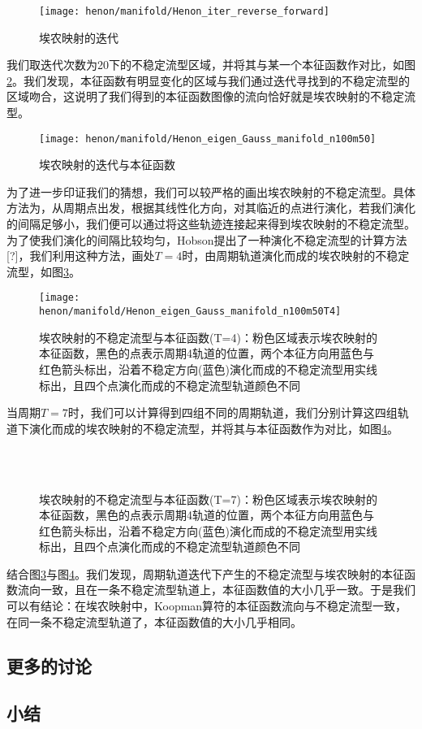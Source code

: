 \begin{figure}
	\centering
	\texttt{[image: henon/manifold/Henon\_iter\_reverse\_forward]}
    \caption{埃农映射的迭代}\label{fig:Henon_iter_reverse_forward}
\end{figure}
我们取迭代次数为20下的不稳定流型区域，并将其与某一个本征函数作对比，如图\ref{fig:Henon_eigen_Gauss_manifold_n100m50}。我们发现，本征函数有明显变化的区域与我们通过迭代寻找到的不稳定流型的区域吻合，这说明了我们得到的本征函数图像的流向恰好就是埃农映射的不稳定流型。
\begin{figure}
	\centering
	\texttt{[image: henon/manifold/Henon\_eigen\_Gauss\_manifold\_n100m50]}
    \caption{埃农映射的迭代与本征函数}\label{fig:Henon_eigen_Gauss_manifold_n100m50}
\end{figure}
为了进一步印证我们的猜想，我们可以较严格的画出埃农映射的不稳定流型。具体方法为，从周期点出发，根据其线性化方向，对其临近的点进行演化，若我们演化的间隔足够小，我们便可以通过将这些轨迹连接起来得到埃农映射的不稳定流型。为了使我们演化的间隔比较均匀，Hobson提出了一种演化不稳定流型的计算方法[?]，我们利用这种方法，画处$T=4$时，由周期轨道演化而成的埃农映射的不稳定流型，如图\ref{fig:Henon_eigen_Gauss_manifold_n100m50T4}。
\begin{figure}
	\centering
	\texttt{[image: henon/manifold/Henon\_eigen\_Gauss\_manifold\_n100m50T4]}
    \caption[埃农映射的不稳定流型与本征函数]{埃农映射的不稳定流型与本征函数(T=4)：粉色区域表示埃农映射的本征函数，黑色的点表示周期4轨道的位置，两个本征方向用蓝色与红色箭头标出，沿着不稳定方向(蓝色)演化而成的不稳定流型用实线标出，且四个点演化而成的不稳定流型轨道颜色不同}\label{fig:Henon_eigen_Gauss_manifold_n100m50T4}
\end{figure}
当周期$T=7$时，我们可以计算得到四组不同的周期轨道，我们分别计算这四组轨道下演化而成的埃农映射的不稳定流型，并将其与本征函数作为对比，如图\ref{fig:Henon_eigen_Gauss_manifold_n100m50T7_4}。
\begin{figure}
    \centering
    \\
    \\
    \caption[埃农映射的不稳定流型与本征函数]{埃农映射的不稳定流型与本征函数(T=7)：粉色区域表示埃农映射的本征函数，黑色的点表示周期4轨道的位置，两个本征方向用蓝色与红色箭头标出，沿着不稳定方向(蓝色)演化而成的不稳定流型用实线标出，且四个点演化而成的不稳定流型轨道颜色不同}\label{fig:Henon_eigen_Gauss_manifold_n100m50T7_4}
\end{figure}
结合图\ref{fig:Henon_eigen_Gauss_manifold_n100m50T4}与图\ref{fig:Henon_eigen_Gauss_manifold_n100m50T7_4}。我们发现，周期轨道迭代下产生的不稳定流型与埃农映射的本征函数流向一致，且在一条不稳定流型轨道上，本征函数值的大小几乎一致。于是我们可以有结论：在埃农映射中，Koopman算符的本征函数流向与不稳定流型一致，在同一条不稳定流型轨道了，本征函数值的大小几乎相同。
\subsection{更多的讨论}

\subsection{小结}
